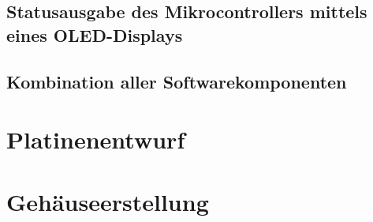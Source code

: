 \subsection{Statusausgabe des Mikrocontrollers mittels eines OLED-Displays}

\subsection{Kombination aller Softwarekomponenten}



\section{Platinenentwurf}

\section{Gehäuseerstellung}
